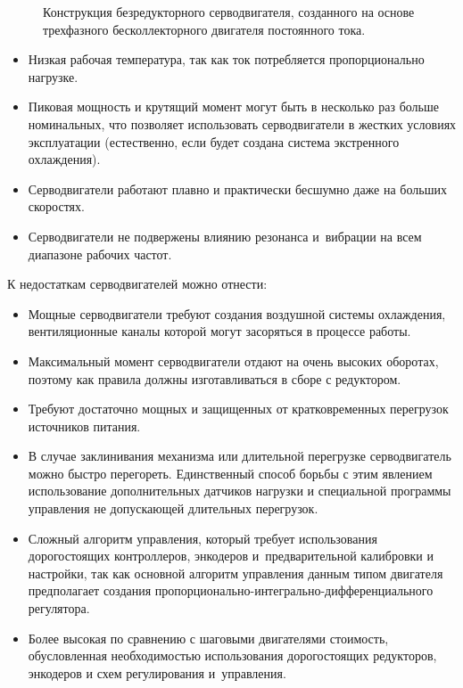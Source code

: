 \begin{figure}[ht]
	\caption{Конструкция безредукторного серводвигателя, созданного на основе трехфазного бесколлекторного двигателя постоянного тока.}\label{fig:servo}
\end{figure}

\begin{itemize}
	\item Низкая рабочая температура, так как ток потребляется пропорционально нагрузке.
	
	\item Пиковая мощность и крутящий момент могут быть в несколько раз больше номинальных, что позволяет использовать серводвигатели в жестких условиях эксплуатации (естественно, если будет создана система экстренного охлаждения).
	
	\item Серводвигатели работают плавно и практически бесшумно даже на больших скоростях.
	
	\item Серводвигатели не подвержены влиянию резонанса и~вибрации на всем диапазоне рабочих частот.
\end{itemize}

К недостаткам серводвигателей можно отнести:

\begin{itemize}
	\item Мощные серводвигатели требуют создания воздушной системы охлаждения, вентиляционные каналы которой могут засоряться в процессе работы.
	
	\item Максимальный момент серводвигатели отдают на очень высоких оборотах, поэтому как правила должны изготавливаться в сборе с редуктором.
	
	\item Требуют достаточно мощных и защищенных от кратковременных перегрузок источников питания.
	
	\item В случае заклинивания механизма или длительной перегрузке серводвигатель можно быстро перегореть. Единственный способ борьбы с этим явлением использование дополнительных датчиков нагрузки и специальной программы управления не допускающей длительных перегрузок.
	
	\item Сложный алгоритм управления, который требует использования дорогостоящих контроллеров, энкодеров и~предварительной калибровки и настройки, так как основной алгоритм управления данным типом двигателя предполагает создания пропорционально-интегрально-дифференциального регулятора.
	
	\item Более высокая по сравнению с шаговыми двигателями стоимость, обусловленная необходимостью использования дорогостоящих редукторов, энкодеров и схем регулирования и~управления.
\end{itemize}

